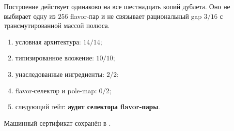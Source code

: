 \begin{nogocriterion}
Построение действует одинаково на все шестнадцать копий дублета. Оно не
выбирает одну из $256$ flavor-пар и не связывает рациональный gap $3/16$ с
трансмутированной массой полюса.
\end{nogocriterion}

\begin{protocol}\begin{enumerate}
\item условная архитектура: \textbf{$14/14$};
\item типизированное вложение: \textbf{$10/10$};
\item унаследованные ингредиенты: \textbf{$2/2$};
\item flavor-селектор и pole-map: \textbf{$0/2$};
\item следующий гейт: \textbf{аудит селектора flavor-пары}.
\end{enumerate}\end{protocol}

Машинный сертификат сохранён в
.